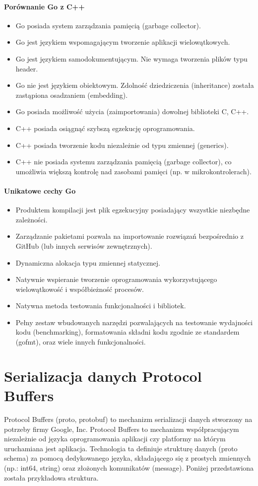 \documentclass[a4paper,12pt,twoside,openany]{report}
\begin{document}
\paragraph{Porównanie Go z C++}
\begin{itemize}
 \item Go posiada system zarządzania pamięcią (garbage collector).
 \item Go jest językiem wspomagającym tworzenie aplikacji wielowątkowych.
 \item Go jest językiem samodokumentującym. Nie wymaga tworzenia plików typu header.
 \item Go nie jest językiem obiektowym. Zdolność dziedziczenia (inheritance) została zastąpiona osadzaniem (embedding).
 \item Go posiada możliwość użycia (zaimportowania) dowolnej biblioteki C, C++.
 \item C++ posiada osiągnąć szybszą egzekucję oprogramowania.
 \item C++ posiada tworzenie kodu niezależnie od typu zmiennej (generics).
 \item C++ nie posiada systemu zarządzania pamięcią (garbage collector), co umożliwia większą kontrolę nad zasobami pamięci (np. w mikrokontrolerach).
\end{itemize}

\paragraph{Unikatowe cechy Go}
\begin{itemize}
 \item Produktem kompilacji jest plik egzekucyjny posiadający wszystkie niezbędne zależności.
 \item Zarządzanie pakietami pozwala na importowanie rozwiązań bezpośrednio z GitHub (lub innych serwisów zewnętrznych).
 \item Dynamiczna alokacja typu zmiennej statycznej.
 \item Natywnie wspieranie tworzenie oprogramowania wykorzystującego wielowątkowość i współbieżność procesów.
 \item Natywna metoda testowania funkcjonalności i bibliotek.
 \item Pełny zestaw wbudowanych narzędzi pozwalających na testowanie wydajności kodu (benchmarking), formatowania składni kodu zgodnie ze standardem (gofmt),
       oraz wiele innych funkcjonalności.
\end{itemize}

\section{Serializacja danych Protocol Buffers}
Protocol Buffers (proto, protobuf) to mechanizm serializacji danych stworzony na potrzeby firmy Google, Inc.
Protocol Buffers to mechanizm współpracującym niezależnie od języka oprogramowania aplikacji czy platformy na którym uruchamiana jest aplikacja.
Technologia ta definiuje strukturę danych (proto schema) za pomocą dedykowanego języka, składającego się z prostych zmiennych (np.: int64, string) 
oraz złożonych komunikatów (message). Poniżej przedstawiona została przykładowa struktura.
\end{document}
